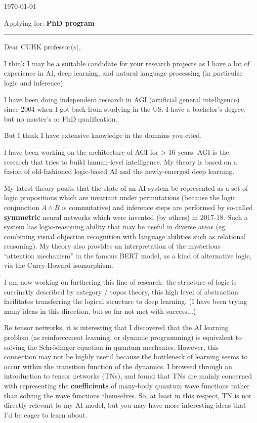 
\today

{\small Applying for: \textbf{PhD program}}

\begin{center}
	\rule{0.8\textwidth}{1pt}
\end{center}

Dear CUHK professor(s),

I think I may be a suitable candidate for your research projects as I have a lot of experience in AI, deep learning, and natural language processing (in particular logic and inference).

I have been doing independent research in AGI (artificial general intelligence) since 2004 when I got back from studying in the US.  I have a bachelor's degree, but no master's or PhD qualification.

But I think I have extensive knowledge in the domains you cited.  

I have been working on the architecture of AGI for > 16 years.  AGI is the research that tries to build human-level intelligence.  My theory is based on a fusion of old-fashioned logic-based AI and the newly-emerged deep learning.

My latest theory posits that the state of an AI system be represented as a set of logic propositions which are invariant under permutations (because the logic conjunction $A \wedge B$ is commutative) and inference steps are performed by so-called \textbf{symmetric} neural networks which were invented (by others) in 2017-18.  Such a system has logic-reasoning ability that may be useful in diverse areas (eg. combining visual objection recognition with language abilities such as relational reasoning).  My theory also provides an interpretation of the mysterious ``attention mechanism'' in the famous BERT model, as a kind of alternative logic, via the Curry-Howard isomorphism.

I am now working on furthering this line of research:  the structure of logic is succinctly described by category / topos theory, this high level of abstraction facilitates transferring the logical structure to deep learning.  (I have been trying many ideas in this direction, but so far not met with success...)

Re tensor networks, it is interesting that I discovered that the AI learning problem (as reinforcement learning, or dynamic programming) is equivalent to solving the Schr\"{o}dinger equation in quantum mechanics.  However, this connection may not be highly useful because the bottleneck of learning seems to occur within the transition function of the dynamics.  I browsed through an introduction to tensor networks (TNs), and found that TNs are mainly concerned with representing the \textbf{coefficients} of many-body quantum wave functions rather than solving the wave functions themselves.  So, at least in this respect, TN is not directly relevant to my AI model, but you may have more interesting ideas that I'd be eager to learn about.



